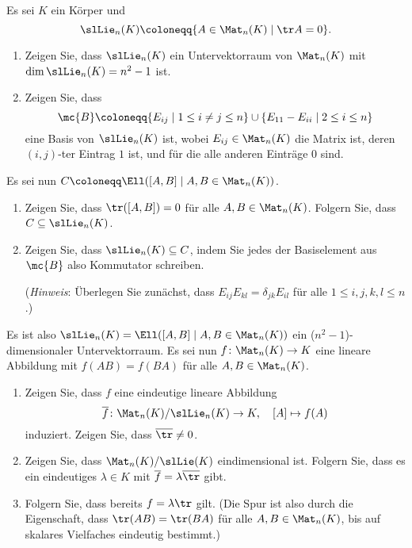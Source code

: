 \begin{question}
  Es sei $K$ ein Körper und
  \[
              \slLie_n(K)
    \coloneqq \{ A \in \Mat_n(K) \mid \tr A = 0 \}.
  \]
  \begin{enumerate}
    \item
      Zeigen Sie, dass $\slLie_n(K)$ ein Untervektorraum von $\Mat_n(K)$ mit $\dim \slLie_n(K) = n^2 - 1$ ist.
    \item
      Zeigen Sie, dass
      \[
        \mc{B}
        \coloneqq
              \{ E_{ij} \mid 1 \leq i \neq j \leq n \}
        \cup  \{ E_{11} - E_{ii} \mid 2 \leq i \leq n \}
      \]
      eine Basis von $\slLie_n(K)$ ist, wobei $E_{ij} \in \Mat_n(K)$ die Matrix ist, deren $(i,j)$-ter Eintrag $1$ ist, und für die alle anderen Einträge $0$ sind.
  \end{enumerate}
  Es sei nun $C \coloneqq \Ell( [A,B] \mid A, B \in \Mat_n(K) )$.
  \begin{enumerate}[resume]
    \item
      Zeigen Sie, dass $\tr([A,B]) = 0$ für alle $A, B \in \Mat_n(K)$.
      Folgern Sie, dass $C \subseteq \slLie_n(K)$.
    \item
      Zeigen Sie, dass $\slLie_n(K) \subseteq C$, indem Sie jedes der Basiselement aus $\mc{B}$ also Kommutator schreiben.
      
      (\emph{Hinweis}:
       Überlegen Sie zunächst, dass $E_{ij} E_{kl} = \delta_{jk} E_{il}$ für alle $1 \leq i, j, k, l \leq n$.)
  \end{enumerate}
  Es ist also $\slLie_n(K) = \Ell( [A,B] \mid A, B \in \Mat_n(K) )$ ein ($n^2 - 1$)-dimensionaler Untervektorraum.
  Es sei nun $f \colon \Mat_n(K) \to K$ eine lineare Abbildung mit $f(AB) = f(BA)$ für alle $A, B \in \Mat_n(K)$.
  \begin{enumerate}[resume]
    \item
      Zeigen Sie, dass $f$ eine eindeutige lineare Abbildung
      \[
        \overline{f} \colon \Mat_n(K) / \slLie_n(K) \to K,
        \quad
        [A] \mapsto f(A)
      \]
      induziert.
      Zeigen Sie, dass $\overline{\tr} \neq 0$.
    \item
      Zeigen Sie, dass $\Mat_n(K) / \slLie(K)$ eindimensional ist.
      Folgern Sie, dass es ein eindeutiges $\lambda \in K$ mit $\overline{f} = \lambda \overline{\tr}$ gibt.
    \item
      Folgern Sie, dass bereits $f = \lambda \tr$ gilt.
      (Die Spur ist also durch die Eigenschaft, dass $\tr(AB) = \tr(BA)$ für alle $A, B \in \Mat_n(K)$, bis auf skalares Vielfaches eindeutig bestimmt.)
  \end{enumerate}
\end{question}


